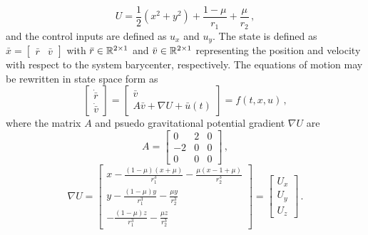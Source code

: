 \documentclass[letterpaper, paper,11pt]{AAS}		%
\begin{document}
\begin{equation}
	U = \frac{1}{2} \left( x^2 + y^2\right) + \frac{1-\mu}{r_1} + \frac{\mu}{r_2}\, ,
	\label{eq:eff_pot}
\end{equation}
and the control inputs are defined as \( u_x\) and \(u_y\).
The state is defined as \( \bar{x} = \begin{bmatrix}\bar{r} &\bar{v} \end{bmatrix}\) with \(\bar{r} \in \mathbb{R}^{2\times1}\) and \(\bar{v} \in \mathbb{R}^{2\times1}\) representing the position and velocity with respect to the system barycenter, respectively.
The equations of motion may be rewritten in state space form as
\begin{equation}
	\left[\begin{array}{c} \dot{\bar{r}} \\ \dot{\bar{v}} \end{array} \right] = 
	\left[ \begin{array}{c} \bar{v} \\ A \bar{v} + \nabla U + \bar{u}(t) \end{array} \right] = f\left( t,x, u\right) \, ,
\end{equation}
where the matrix \( A \) and psuedo gravitational potential gradient \( \nabla U\) are
\begin{equation}\label{eq:A_mat}
	A = \left[ \begin{array}{ccc} 0 & 2 & 0 \\ -2 & 0 & 0 \\ 0 & 0 & 0 \end{array} \right] \, ,
\end{equation}
\begin{equation} \label{eq:grav_pot}
	\nabla U = \left[ \begin{array}{c} x - \frac{ \left(1 - \mu\right) \left(x + \mu\right)}{r_1^3} - \frac{\mu \left( x - 1 + \mu \right)}{r_2^3} \\
											y - \frac{ \left(1 - \mu\right) y}{r_1^3} - \frac{\mu y}{r_2^3} \\
											- \frac{ \left(1 - \mu\right) z}{r_1^3} - \frac{\mu z}{r_2^3}\end{array}\right]
					= \left[\begin{array}{c} U_x \\ U_y \\ U_z\end{array} \right] \, .
\end{equation}
\end{document}
